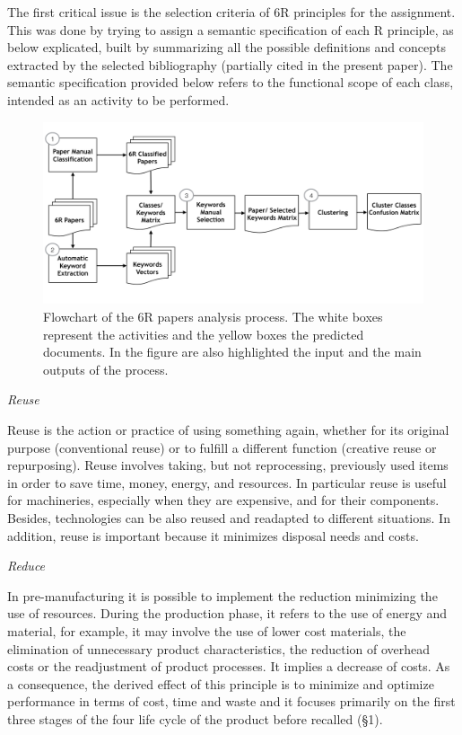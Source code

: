 \documentclass[]{book}
\begin{document}
The first critical issue is the selection criteria of 6R principles for
the assignment. This was done by trying to assign a semantic
specification of each R principle, as below explicated, built by
summarizing all the possible definitions and concepts extracted by the
selected bibliography (partially cited in the present paper). The
semantic specification provided below refers to the functional scope of
each class, intended as an activity to be performed.

\begin{figure}

{\centering \includegraphics[width=0.8\linewidth]{_bookdown_files/figures/workflow_sm} 

}

\caption{Flowchart of the 6R papers analysis process. The white boxes represent the activities and the yellow boxes the predicted documents. In the figure are also highlighted the input and the main outputs of the process.}\label{fig:wfsm}
\end{figure}

\emph{Reuse}

Reuse is the action or practice of using something again, whether for
its original purpose (conventional reuse) or to fulfill a different
function (creative reuse or repurposing). Reuse involves taking, but not
reprocessing, previously used items in order to save time, money,
energy, and resources. In particular reuse is useful for machineries,
especially when they are expensive, and for their components. Besides,
technologies can be also reused and readapted to different situations.
In addition, reuse is important because it minimizes disposal needs and
costs.

\emph{Reduce}

In pre-manufacturing it is possible to implement the reduction
minimizing the use of resources. During the production phase, it refers
to the use of energy and material, for example, it may involve the use
of lower cost materials, the elimination of unnecessary product
characteristics, the reduction of overhead costs or the readjustment of
product processes. It implies a decrease of costs. As a consequence, the
derived effect of this principle is to minimize and optimize performance
in terms of cost, time and waste and it focuses primarily on the first
three stages of the four life cycle of the product before recalled (§1).
\end{document}
